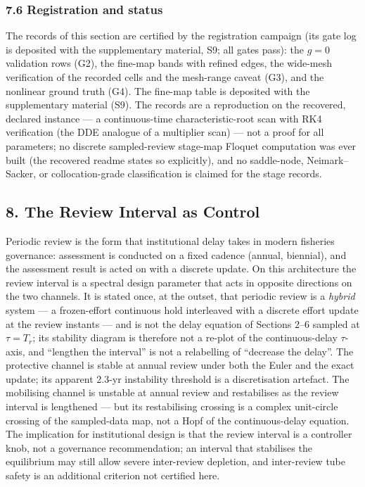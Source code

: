 \documentclass[11pt]{article}
\begin{document}
\subsubsection{7.6 Registration and
status}\label{registration-and-status}

The records of this section are certified by the registration campaign
(its gate log is deposited with the supplementary material, S9; all
gates pass): the \(g = 0\) validation rows (G2), the fine-map bands with
refined edges, the wide-mesh verification of the recorded cells and the
mesh-range caveat (G3), and the nonlinear ground truth (G4). The
fine-map table is deposited with the supplementary material (S9). The
records are a reproduction on the recovered, declared instance --- a
continuous-time characteristic-root scan with RK4 verification (the DDE
analogue of a multiplier scan) --- not a proof for all parameters; no
discrete sampled-review stage-map Floquet computation was ever built
(the recovered readme states so explicitly), and no saddle-node,
Neimark--Sacker, or collocation-grade classification is claimed for the
stage records.

\subsection{8. The Review Interval as
Control}\label{the-review-interval-as-control}

Periodic review is the form that institutional delay takes in modern
fisheries governance: assessment is conducted on a fixed cadence
(annual, biennial), and the assessment result is acted on with a
discrete update. On this architecture the review interval is a spectral
design parameter that acts in opposite directions on the two channels.
It is stated once, at the outset, that periodic review is a
\emph{hybrid} system --- a frozen-effort continuous hold interleaved
with a discrete effort update at the review instants --- and is not the
delay equation of Sections 2--6 sampled at \(\tau = T_r\); its stability
diagram is therefore not a re-plot of the continuous-delay
\(\tau\)-axis, and ``lengthen the interval'' is not a relabelling of
``decrease the delay''. The protective channel is stable at annual
review under both the Euler and the exact update; its apparent 2.3-yr
instability threshold is a discretisation artefact. The mobilising
channel is unstable at annual review and restabilises as the review
interval is lengthened --- but its restabilising crossing is a complex
unit-circle crossing of the sampled-data map, not a Hopf of the
continuous-delay equation. The implication for institutional design is
that the review interval is a controller knob, not a governance
recommendation; an interval that stabilises the equilibrium may still
allow severe inter-review depletion, and inter-review tube safety is an
additional criterion not certified here.
\end{document}
